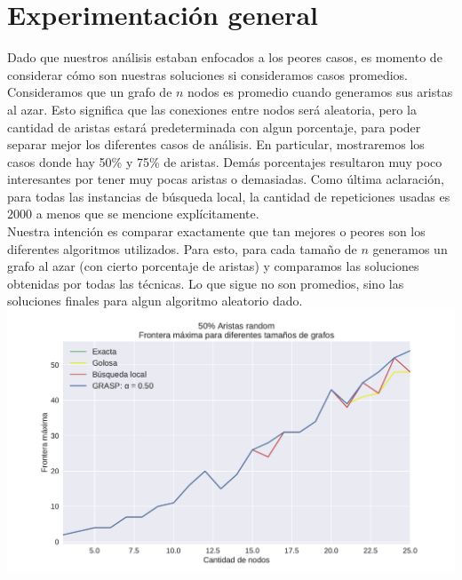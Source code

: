 \section{Experimentación general}

Dado que nuestros análisis estaban enfocados a los peores casos, es momento de considerar cómo son nuestras soluciones si consideramos casos promedios.  \\

Consideramos que un grafo de $n$ nodos es promedio cuando generamos sus aristas al azar. Esto significa que las conexiones entre nodos será aleatoria, pero la cantidad de aristas estará predeterminada con algun porcentaje, para poder separar mejor los diferentes casos de análisis. En particular, mostraremos los casos donde hay 50\% y 75\% de aristas. Demás porcentajes resultaron muy poco interesantes por tener muy pocas aristas o demasiadas. Como última aclaración, para todas las instancias de búsqueda local, la cantidad de repeticiones usadas es $2000$ a menos que se mencione explícitamente. \\

Nuestra intención es comparar exactamente que tan mejores o peores son los diferentes algoritmos utilizados. Para esto, para cada tamaño de $n$ generamos un grafo al azar (con cierto porcentaje de aristas) y comparamos las soluciones obtenidas por todas las técnicas. Lo que sigue no son promedios, sino las soluciones finales para algun algoritmo aleatorio dado. \\

{\centering
    \includegraphics[width=1\textwidth]{informe/imgs/exp_random50_frontera_todos_v2.pdf}
}
$ $ \newline

